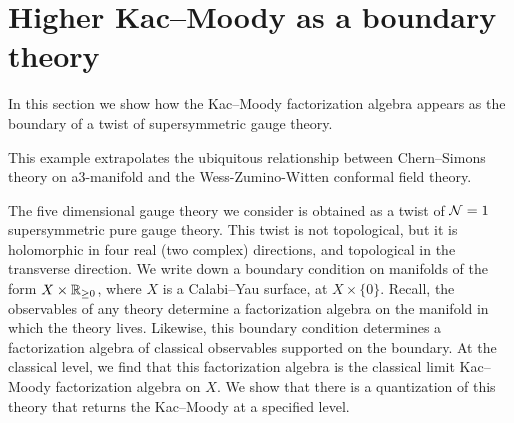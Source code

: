 \section{Higher Kac--Moody as a boundary theory}

In this section we show how the Kac--Moody factorization algebra appears as the boundary of a twist of supersymmetric gauge theory.

This example extrapolates the ubiquitous relationship between Chern--Simons theory on a$3$-manifold and the Wess-Zumino-Witten conformal field theory.

The five dimensional gauge theory we consider is obtained as a twist of $\mathcal N=1$ supersymmetric pure gauge theory.
This twist is not topological, but it is holomorphic in four real (two complex) directions, and topological in the transverse direction.
We write down a boundary condition on manifolds of the form $X \times \mathbb R_{\geq 0}$, where $X$ is a Calabi--Yau surface, at $X \times \{0\}$.
Recall, the observables of any theory determine a factorization algebra on the manifold in which the theory lives. 
Likewise, this boundary condition determines a factorization algebra of classical observables supported on the boundary. 
At the classical level, we find that this factorization algebra is the classical limit Kac--Moody factorization algebra on $X$.
We show that there is a quantization of this theory that returns the Kac--Moody at a specified level.  

\begin{rmk} 
\end{rmk}

%
%

